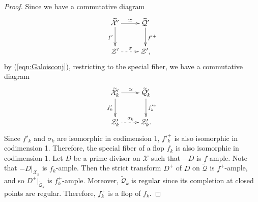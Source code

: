 \documentclass[autodetect-engine, a4paper]{amsart}
\theoremstyle{definition}
\begin{document}
\begin{proof}
Since we have a commutative diagram
\[
 \xymatrix{
\widetilde{\mathcal{X}}' \ar[r]^{\simeq} \ar[d]_{f'}
& \widetilde{\mathcal{Q}}'  \ar[d]^{f'^{+}}\\
\mathcal{Z}' \ar@{..>}[r]^{\sigma} 
&\mathcal{Z}',
}
\]
by (\ref{eqn:Galoisconj}),
restricting to the special fiber, we have a commutative diagram
\[
 \xymatrix{
\widetilde{\mathcal{X}}'_{k} \ar[r]^{\simeq} \ar[d]_{f'_k}
& \widetilde{\mathcal{Q}}'_{k}  \ar[d]^{f'^{+}_{k}}\\
\mathcal{Z}'_{k} \ar@{..>}[r]^{\sigma_{k}} 
&\mathcal{Z}'_{k}.
}
\]
Since $f'_{k}$ and $\sigma_k$ are isomorphic in codimension 1,
$f'^{+}_{k}$ is also isomorphic in codimension 1. 
Therefore, the special fiber of a flop $f_{k}$ is also isomorphic in codimension 1.
Let $D$ be a prime divisor on $\mathcal{X}$ such that $-D$ is $f$-ample. Note that $-D|_{\mathcal{X}_{k}}$ is $f_{k}$-ample.
Then the strict transform $D^{+}$ of $D$ on $\widetilde{\mathcal{Q}}$ is $f^{+}$-ample, and so $D^{+}|_{\widetilde{\mathcal{Q}}_{k}}$ is $f^{+}_{k}$-ample.
Moreover, $\widetilde{\mathcal{Q}}_{k}$ is regular since its completion at closed points are regular.
Therefore, $f^{+}_{k}$ is a flop of $f_{k}$.


\end{proof}
\end{document}
